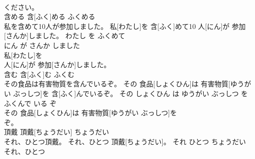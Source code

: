 \documentclass[8pt]{extreport}
\begin{document}
\begin{CJK}{UTF8}{min}
\\	ください。		
\\	含める	含[ふく]める	ふくめる	
\\	私を含めて10人が参加しました。	私[わたし]を 含[ふく]めて10 人[にん]が 参加[さんか]しました。	わたし を ふくめて 
\\	にん が さんか しました	
\\	私[わたし]を
\\	人[にん]が 参加[さんか]しました。		
\\	含む	含[ふく]む	ふくむ	
\\	その食品は有害物質を含んでいるぞ。	その 食品[しょくひん]は 有害物質[ゆうがい ぶっしつ]を 含[ふく]んでいるぞ。	その しょくひん は ゆうがい ぶっしつ を ふくんで いる ぞ	
\\	その 食品[しょくひん]は 有害物質[ゆうがい ぶっしつ]を
\\	ぞ。		
\\	頂戴	頂戴[ちょうだい]	ちょうだい	
\\	それ、ひとつ頂戴。	それ、ひとつ 頂戴[ちょうだい]。	それ ひとつ ちょうだい	
\\	それ、ひとつ
\end{CJK}
\end{document}

